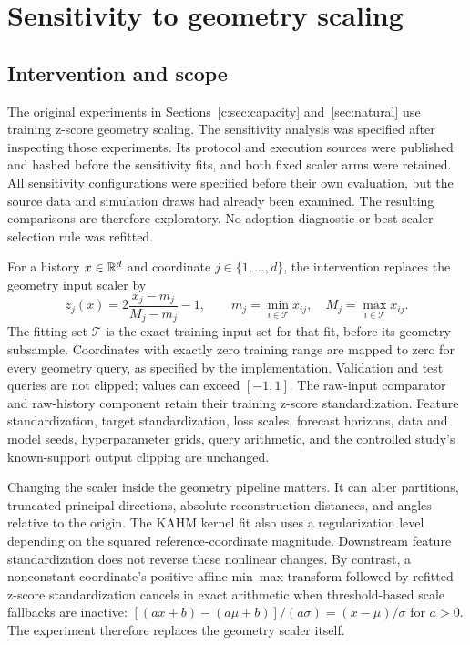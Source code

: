 \section{Sensitivity to geometry scaling}\label{app:scaling}
\subsection{Intervention and scope}
The original experiments in Sections~\ref{c:sec:capacity} and~\ref{sec:natural}
use training z-score geometry scaling. The sensitivity analysis was specified
after inspecting those experiments. Its protocol and execution sources were
published and hashed before the sensitivity fits, and both fixed scaler arms
were retained. All sensitivity configurations were specified before their own
evaluation, but the source data and simulation draws had already been
examined. The resulting comparisons are therefore exploratory. No adoption diagnostic or best-scaler selection
rule was refitted.

For a history $x\in\mathbb{R}^d$ and coordinate $j\in\{1,\ldots,d\}$,
the intervention replaces the geometry input scaler by
\[
 z_j(x)=2\frac{x_j-m_j}{M_j-m_j}-1,
 \qquad m_j=\min_{i\in\mathcal T}x_{ij},\quad
 M_j=\max_{i\in\mathcal T}x_{ij}.
\]
The fitting set $\mathcal T$ is the exact training input set for that fit,
before its geometry subsample. Coordinates with exactly zero training range
are mapped to zero for every geometry query, as specified by the implementation. Validation and test queries are not clipped; values can
exceed $[-1,1]$. The raw-input comparator and raw-history component retain their
training z-score standardization. Feature standardization, target standardization, loss scales,
forecast horizons, data and model seeds, hyperparameter grids, query arithmetic,
and the controlled study's known-support output clipping are unchanged.

Changing the scaler inside the geometry pipeline matters. It can alter
partitions, truncated principal directions, absolute reconstruction distances,
and angles relative to the origin. The KAHM kernel fit also uses a
regularization level depending on the squared reference-coordinate magnitude.
Downstream feature standardization does not reverse these nonlinear changes.
By contrast, a nonconstant coordinate's positive affine min--max transform
followed by refitted z-score standardization cancels in exact arithmetic
when threshold-based scale fallbacks are inactive:
$[(a x+b)-(a\mu+b)]/(a\sigma)=(x-\mu)/\sigma$ for $a>0$.
The experiment therefore replaces the geometry scaler itself.

